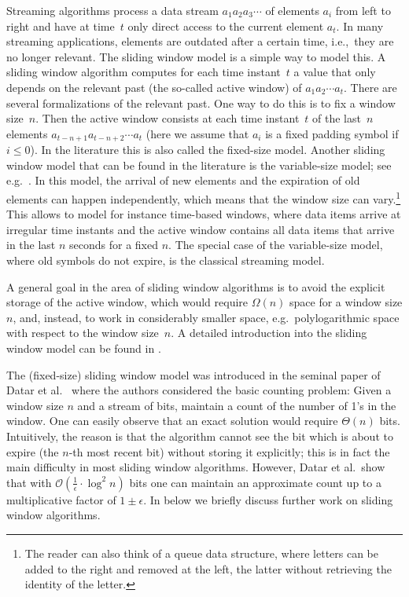 \documentclass{theoretics}
\renewcommand{\O}{\mathcal{O}}
\renewcommand{\leq}{\leqslant}
\begin{document}
Streaming algorithms process a data stream $a_1 a_2 a_3 \cdots$
of elements $a_i$ from left to right and have at time~$t$ only direct access to the current element $a_t$.
In many streaming applications, elements are outdated after a certain time, i.e.,~they are no longer relevant.
The sliding window model is a simple way to model this.
A sliding window algorithm computes for each time instant~$t$ a value
that only depends on the relevant past (the so-called active window) of $a_1 a_2 \cdots a_t$. 
There are several formalizations of the relevant past. One way to do this is to fix a 
window size~$n$. Then the active window consists at each time instant~$t$ of the last~$n$
elements $a_{t-n+1} a_{t-n+2} \cdots a_t$ (here we assume that $a_i$ is a fixed padding symbol if $i \leq 0$). In the literature this is also called the fixed-size model.
Another sliding window model that can be found in the literature is the variable-size model; see e.g.~\cite{ArasuM04}.
In this model, the arrival of new elements and the expiration of old elements
can happen independently, which means that the window size can vary.\footnote{The reader can also think of a 
queue data structure, where letters can be added to the right and removed at the left, the latter without retrieving the identity of the letter.}
This allows to model for instance time-based windows, where data items arrive at irregular
time instants and the active window contains
all data items that arrive in the last $n$ seconds for a fixed $n$.
The special case of the variable-size model, where old symbols do not expire, is the classical
streaming model.

A general goal in the area of sliding window algorithms is to avoid the explicit storage
of the active window, which would require $\Omega(n)$ space for a window size $n$, and,
instead, to work in considerably smaller space,
e.g.~polylogarithmic space with respect to the window size~$n$.
A detailed introduction into the sliding window model can be found in \cite[Chapter~8]{Aggarwal07}.

The (fixed-size) sliding window model was introduced
in the seminal paper of Datar et al.~\cite{DatarGIM02}
where the authors considered the basic counting problem:
Given a window size $n$ and a stream of bits,
maintain a count of the number of 1’s in the window.
One can easily observe that an exact solution would require $\Theta(n)$ bits.
Intuitively, the reason is that the algorithm cannot see the bit which is
about to expire (the $n$-th most recent bit) without storing it explicitly; this is in fact the main difficulty
in most sliding window algorithms.
However, Datar et al.~show that with $\O(\frac{1}{\epsilon} \cdot \log^2 n)$ bits
one can maintain an approximate count up to a multiplicative factor of $1 \pm \epsilon$.
In  below we briefly discuss further work on sliding window
algorithms.
\end{document}
